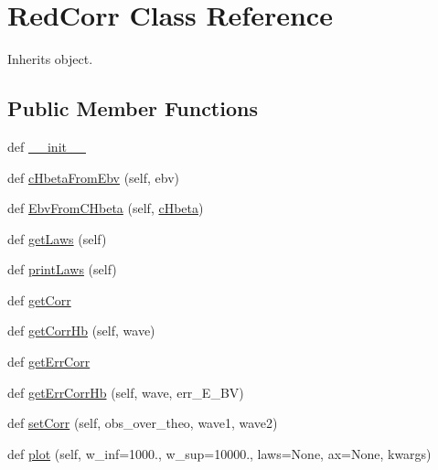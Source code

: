 \hypertarget{classpyneb_1_1extinction_1_1red__corr_1_1_red_corr}{}\section{Red\+Corr Class Reference}
\label{classpyneb_1_1extinction_1_1red__corr_1_1_red_corr}


Inherits object.

\subsection*{Public Member Functions}
\begin{DoxyCompactItemize}
\item 
def \hyperlink{classpyneb_1_1extinction_1_1red__corr_1_1_red_corr_ac775ee34451fdfa742b318538164070e}{\+\_\+\+\_\+init\+\_\+\+\_\+}
\item 
def \hyperlink{classpyneb_1_1extinction_1_1red__corr_1_1_red_corr_a15b3a29efeb2cf60e199d29814ac220e}{c\+Hbeta\+From\+Ebv} (self, ebv)
\item 
def \hyperlink{classpyneb_1_1extinction_1_1red__corr_1_1_red_corr_a4f1fcc53399a219a6c2bebac93fa4140}{Ebv\+From\+C\+Hbeta} (self, \hyperlink{classpyneb_1_1extinction_1_1red__corr_1_1_red_corr_a50ca368c1b96db154e41c1534fa193cd}{c\+Hbeta})
\item 
def \hyperlink{classpyneb_1_1extinction_1_1red__corr_1_1_red_corr_a52ebb1c85b01df1136b33b9daa746e56}{get\+Laws} (self)
\item 
def \hyperlink{classpyneb_1_1extinction_1_1red__corr_1_1_red_corr_a31e90c92561dfe67eabc05d523102dcc}{print\+Laws} (self)
\item 
def \hyperlink{classpyneb_1_1extinction_1_1red__corr_1_1_red_corr_a7f55de02f3ebbced0e315afb1799861f}{get\+Corr}
\item 
def \hyperlink{classpyneb_1_1extinction_1_1red__corr_1_1_red_corr_a351c7653480349549c3e8999b0078777}{get\+Corr\+Hb} (self, wave)
\item 
def \hyperlink{classpyneb_1_1extinction_1_1red__corr_1_1_red_corr_a2d72a98f06c1bf76aa68aa633e0b1495}{get\+Err\+Corr}
\item 
def \hyperlink{classpyneb_1_1extinction_1_1red__corr_1_1_red_corr_ae7fe1111f217b216d5ca712349a5290c}{get\+Err\+Corr\+Hb} (self, wave, err\+\_\+\+E\+\_\+\+B\+V)
\item 
def \hyperlink{classpyneb_1_1extinction_1_1red__corr_1_1_red_corr_af462017f3ae081cfead57fb373d13495}{set\+Corr} (self, obs\+\_\+over\+\_\+theo, wave1, wave2)
\item 
def \hyperlink{classpyneb_1_1extinction_1_1red__corr_1_1_red_corr_ad6610a83a3f3b201b9029f5ba832bef5}{plot} (self, w\+\_\+inf=1000., w\+\_\+sup=10000., laws=None, ax=None, kwargs)
\end{DoxyCompactItemize}
